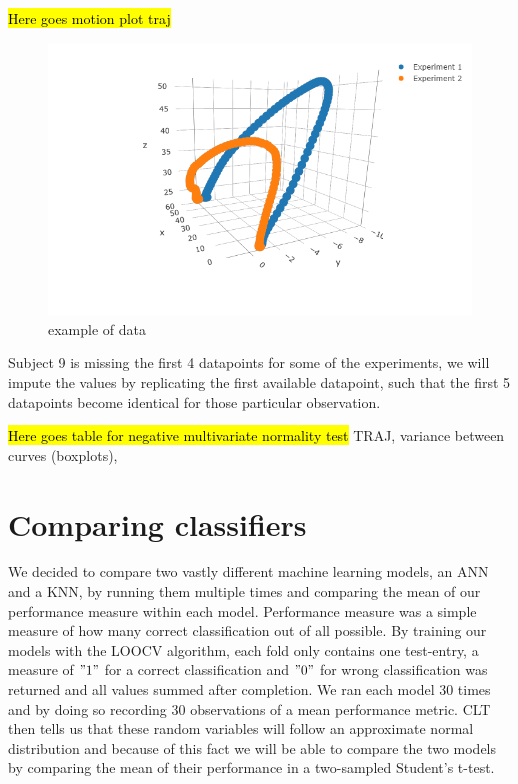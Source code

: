 \documentclass{article}
\begin{document}
\hl{Here goes motion plot traj}

\begin{figure}[H]
\includegraphics[width=\linewidth]{curve.png}
\caption{example of data}
\label{fig:trajectory}
\end{figure}


Subject 9 is missing the first 4 datapoints for some of the experiments, we will impute the values by replicating the first available datapoint, such that the first 5 datapoints become identical for those particular observation.

\hl{Here goes table for negative multivariate normality test}
TRAJ, variance between curves (boxplots), 

\section{Comparing classifiers}
We decided to compare two vastly different machine learning models, an ANN and a KNN, by running them multiple times and comparing the mean of our performance measure within each model. Performance measure was a simple measure of how many correct classification out of all possible. By training our models with the LOOCV algorithm, each fold only contains one test-entry, a measure of $"1"$ for a correct classification and $"0"$ for wrong classification was returned and all values summed after completion. We ran each model 30 times and by doing so recording 30 observations of a mean performance metric. CLT then tells us that these random variables will follow an approximate normal distribution and because of this fact we will be able to compare the two models by comparing the mean of their performance in a two-sampled Student's t-test.\\
\end{document}

